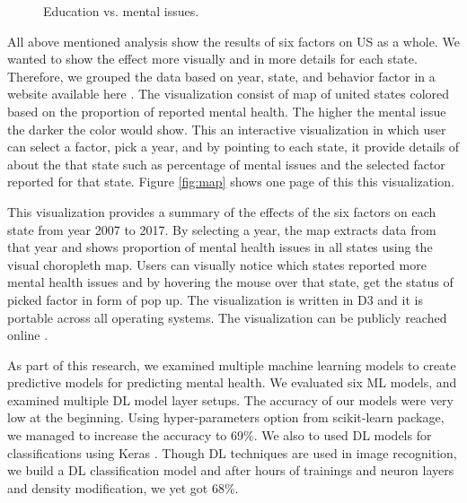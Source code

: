 \documentclass[letterpaper, 10 pt, conference]{ieeeconf}  %
\begin{document}
\begin{figure}[!htb]
        \caption{\label{fig:edu} Education vs. mental issues.}
\end{figure}

All above mentioned analysis show the results of six factors on US as a whole. We wanted to show the effect more visually and in more details 
for each state.
Therefore, we grouped the data based on year, state, and behavior factor in a website available here \cite{brfss-sqlite}. The visualization
consist of map of united states colored based on the proportion of reported mental health. The higher the mental issue the darker 
the color would show. This an interactive visualization in which user can select a factor, pick a year, and by pointing to each 
state, it provide details of about the that state such as percentage of mental issues and the selected factor reported for that state.
Figure \ref{fig:map} shows one page of this this visualization.  

This visualization provides a summary of the effects of the six factors on each state from year 2007 to 2017. 
By selecting a year, the map extracts data from that year and shows proportion of mental health issues in all states
using the visual choropleth map. Users can visually notice which states reported more mental health issues and by 
hovering the mouse over that state, get the status of picked factor in form of pop up. The visualization is written in D3 \cite{d3} 
and it is portable across all operating systems. The visualization can be publicly reached online \cite{visualization}.

As part of this research, we examined multiple machine learning models to create predictive models for predicting mental health. 
We evaluated six ML models, and examined multiple DL model layer setups.
The accuracy of our models were very low at the beginning. Using hyper-parameters option from scikit-learn \cite{scikit} package, we managed to 
increase the accuracy to 69\%. We also to used DL models for classifications using Keras \cite{keras}. 
Though DL techniques are used in image recognition,
we build a DL classification model and after hours of trainings and neuron layers and density modification, we yet got 68\%.
\end{document}
